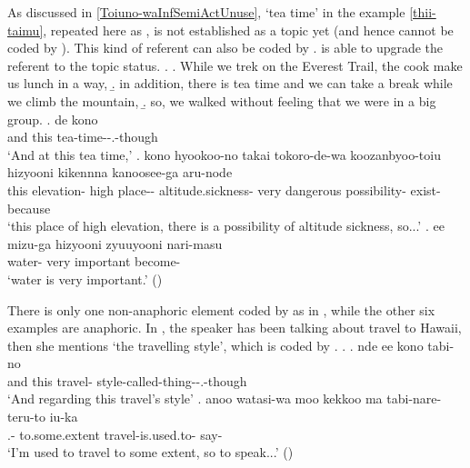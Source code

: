 As discussed in \ref{Toiuno-waInfSemiActUnuse},
`tea time' in the example \ref{thii-taimu}, repeated here as \Next, is not established as a topic yet (and hence cannot be coded by ).
This kind of referent can also be coded by .
 is able to upgrade the referent to the topic status.
%
\ex.\label{thii-taimu2}
 \a. While we trek on the Everest Trail, the cook make us lunch in a way,
 \b. in addition, there is tea time and we can take a break while we climb the mountain,
 \b. so, we walked without feeling that we were in a big group.
 \bg. de kono  \\
		and this tea-time--.-though \\
		`And at this tea time,'
 \bg. kono hyookoo-no {takai} {tokoro-de-wa} koozanbyoo-toiu hizyooni {kikennna} {kanoosee-ga} aru-node \\
		this elevation- high place-- altitude.sickness- very dangerous possibility- exist-because \\
		`this place of high elevation, there is a possibility of altitude sickness, so...'
 \bg. ee {mizu-ga} hizyooni zyuuyooni nari-masu \\
		 water- very important become- \\
		`water is very important.'
		 \hfill{()}

There is only one non-anaphoric element coded by  as in \Next,
while the other six examples are anaphoric.
In \Next,
the speaker has been talking about travel to Hawaii,
then she mentions `the travelling style',
which is coded by .
\ex. \ag. nde ee kono tabi-no  \\
		and  this travel- style-called-thing--.-though \\
		`And regarding this travel's style'
	\bg. anoo watasi-wa moo kekkoo ma tabi-nare-teru-to iu-ka \\
		 .-  to.some.extent  travel-is.used.to- say- \\
		`I'm used to travel to some extent, so to speak...'
		\hfill{()}
%

